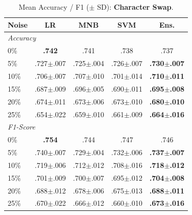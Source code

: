 \documentclass[sigconf]{acmart}
\begin{document}
\begin{table}
  \centering
  \caption{Mean Accuracy / F1 ($\pm$ SD): \textbf{Character Swap}.}
  \label{tab:swap}
  \small
  \begin{tabular}{lcccc}
    \toprule
    \textbf{Noise} & \textbf{LR} & \textbf{MNB} & \textbf{SVM} & \textbf{Ens.} \\
    \midrule
    \multicolumn{5}{l}{\textit{Accuracy}} \\
    0\%  & \textbf{.742} & .741 & .738 & .737 \\
    5\%  & .727$\pm$.007 & .725$\pm$.004 & .726$\pm$.007 & \textbf{.730$\pm$.007} \\
    10\% & .706$\pm$.007 & .707$\pm$.010 & .701$\pm$.014 & \textbf{.710$\pm$.011} \\
    15\% & .687$\pm$.009 & .696$\pm$.005 & .690$\pm$.011 & \textbf{.695$\pm$.008} \\
    20\% & .674$\pm$.011 & .673$\pm$.006 & .673$\pm$.010 & \textbf{.680$\pm$.010} \\
    25\% & .654$\pm$.022 & .659$\pm$.010 & .661$\pm$.009 & \textbf{.664$\pm$.016} \\
    \midrule
    \multicolumn{5}{l}{\textit{F1-Score}} \\
    0\%  & \textbf{.754} & .744 & .747 & .746 \\
    5\%  & .740$\pm$.007 & .729$\pm$.004 & .732$\pm$.006 & \textbf{.737$\pm$.007} \\
    10\% & .719$\pm$.006 & .712$\pm$.012 & .708$\pm$.016 & \textbf{.718$\pm$.012} \\
    15\% & .701$\pm$.009 & .700$\pm$.007 & .695$\pm$.012 & \textbf{.704$\pm$.008} \\
    20\% & .688$\pm$.012 & .678$\pm$.006 & .675$\pm$.013 & \textbf{.688$\pm$.011} \\
    25\% & .670$\pm$.022 & .666$\pm$.012 & .660$\pm$.010 & \textbf{.673$\pm$.016} \\
    \bottomrule
  \end{tabular}
\end{table}
\end{document}

